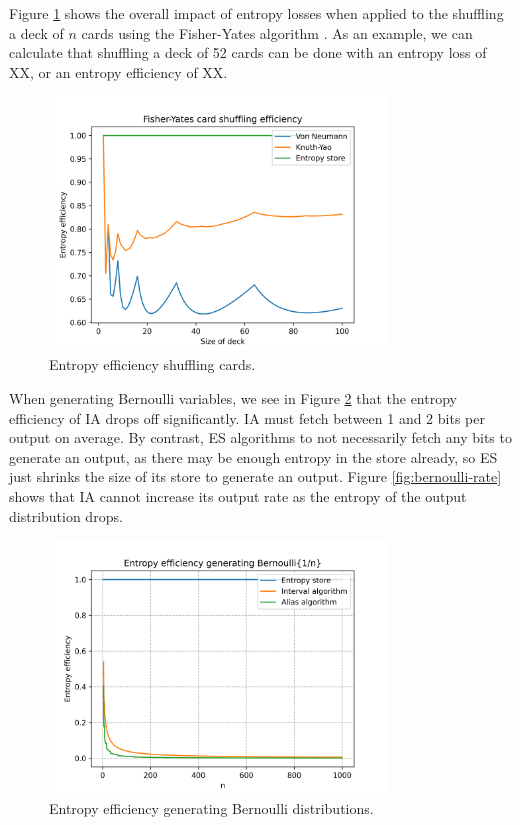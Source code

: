 \documentclass[12pt]{article}
\begin{document}
Figure \ref{fig:shuffling-efficiency} shows the overall impact of entropy losses when applied to the shuffling a deck of $n$ cards using the Fisher-Yates algorithm \cite{fisheryates}. As an example, we can calculate that shuffling a deck of 52 cards can be done with an entropy loss of XX, or an entropy efficiency of XX.

\begin{figure}[ht]
\centering
\includegraphics[width=0.8\textwidth]{shuffling_efficiency.png}
\caption{Entropy efficiency shuffling cards.}
\label{fig:shuffling-efficiency}
\end{figure}

When generating Bernoulli variables, we see in Figure \ref{fig:bernoulli-efficiency} that the entropy efficiency of IA drops off significantly. IA must fetch between 1 and 2 bits per output on average. By contrast, ES algorithms to not necessarily fetch any bits to generate an output, as there may be enough entropy in the store already, so ES just shrinks the size of its store to generate an output. Figure \ref{fig:bernoulli-rate} shows that IA cannot increase its output rate as the entropy of the output distribution drops.

\begin{figure}[ht]
\centering
\includegraphics[width=0.8\textwidth]{bernoulli_efficiency.png}
\caption{Entropy efficiency generating Bernoulli distributions.}
\label{fig:bernoulli-efficiency}
\end{figure}
\end{document}
